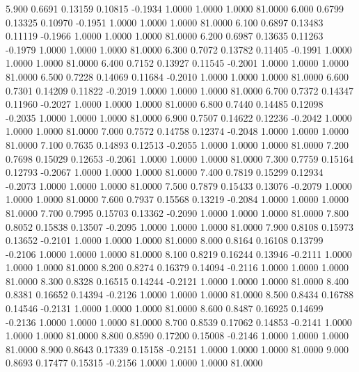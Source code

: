    5.900   0.6691   0.13159   0.10815  -0.1934   1.0000   1.0000   1.0000  81.0000
   6.000   0.6799   0.13325   0.10970  -0.1951   1.0000   1.0000   1.0000  81.0000
   6.100   0.6897   0.13483   0.11119  -0.1966   1.0000   1.0000   1.0000  81.0000
   6.200   0.6987   0.13635   0.11263  -0.1979   1.0000   1.0000   1.0000  81.0000
   6.300   0.7072   0.13782   0.11405  -0.1991   1.0000   1.0000   1.0000  81.0000
   6.400   0.7152   0.13927   0.11545  -0.2001   1.0000   1.0000   1.0000  81.0000
   6.500   0.7228   0.14069   0.11684  -0.2010   1.0000   1.0000   1.0000  81.0000
   6.600   0.7301   0.14209   0.11822  -0.2019   1.0000   1.0000   1.0000  81.0000
   6.700   0.7372   0.14347   0.11960  -0.2027   1.0000   1.0000   1.0000  81.0000
   6.800   0.7440   0.14485   0.12098  -0.2035   1.0000   1.0000   1.0000  81.0000
   6.900   0.7507   0.14622   0.12236  -0.2042   1.0000   1.0000   1.0000  81.0000
   7.000   0.7572   0.14758   0.12374  -0.2048   1.0000   1.0000   1.0000  81.0000
   7.100   0.7635   0.14893   0.12513  -0.2055   1.0000   1.0000   1.0000  81.0000
   7.200   0.7698   0.15029   0.12653  -0.2061   1.0000   1.0000   1.0000  81.0000
   7.300   0.7759   0.15164   0.12793  -0.2067   1.0000   1.0000   1.0000  81.0000
   7.400   0.7819   0.15299   0.12934  -0.2073   1.0000   1.0000   1.0000  81.0000
   7.500   0.7879   0.15433   0.13076  -0.2079   1.0000   1.0000   1.0000  81.0000
   7.600   0.7937   0.15568   0.13219  -0.2084   1.0000   1.0000   1.0000  81.0000
   7.700   0.7995   0.15703   0.13362  -0.2090   1.0000   1.0000   1.0000  81.0000
   7.800   0.8052   0.15838   0.13507  -0.2095   1.0000   1.0000   1.0000  81.0000
   7.900   0.8108   0.15973   0.13652  -0.2101   1.0000   1.0000   1.0000  81.0000
   8.000   0.8164   0.16108   0.13799  -0.2106   1.0000   1.0000   1.0000  81.0000
   8.100   0.8219   0.16244   0.13946  -0.2111   1.0000   1.0000   1.0000  81.0000
   8.200   0.8274   0.16379   0.14094  -0.2116   1.0000   1.0000   1.0000  81.0000
   8.300   0.8328   0.16515   0.14244  -0.2121   1.0000   1.0000   1.0000  81.0000
   8.400   0.8381   0.16652   0.14394  -0.2126   1.0000   1.0000   1.0000  81.0000
   8.500   0.8434   0.16788   0.14546  -0.2131   1.0000   1.0000   1.0000  81.0000
   8.600   0.8487   0.16925   0.14699  -0.2136   1.0000   1.0000   1.0000  81.0000
   8.700   0.8539   0.17062   0.14853  -0.2141   1.0000   1.0000   1.0000  81.0000
   8.800   0.8590   0.17200   0.15008  -0.2146   1.0000   1.0000   1.0000  81.0000
   8.900   0.8643   0.17339   0.15158  -0.2151   1.0000   1.0000   1.0000  81.0000
   9.000   0.8693   0.17477   0.15315  -0.2156   1.0000   1.0000   1.0000  81.0000
